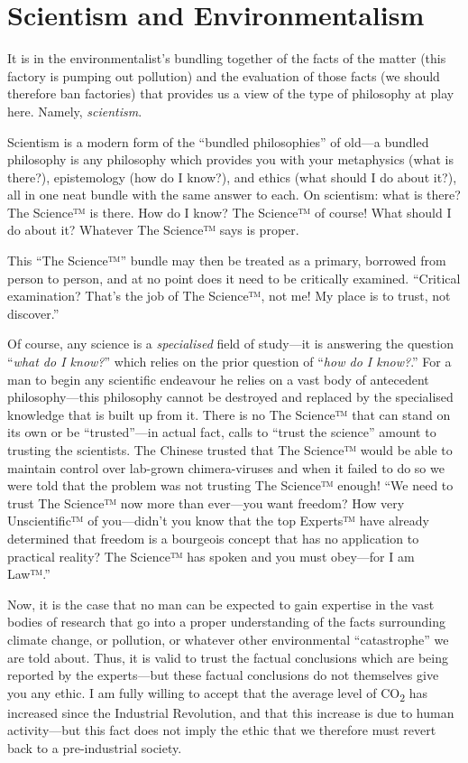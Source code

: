 \documentclass[11pt]{article}
\begin{document}
\section{Scientism and Environmentalism}
\label{sec:org5f4edb6}
It is in the environmentalist's bundling together of the facts of the matter (this factory is pumping out pollution) and the evaluation of those facts (we should therefore ban factories) that provides us a view of the type of philosophy at play here. Namely, \emph{scientism}.

Scientism is a modern form of the ``bundled philosophies'' of old---a bundled philosophy is any philosophy which provides you with your metaphysics (what is there?), epistemology (how do I know?), and ethics (what should I do about it?), all in one neat bundle with the same answer to each. On scientism: what is there? The Science™ is there. How do I know? The Science™ of course! What should I do about it? Whatever The Science™ says is proper.

This ``The Science™'' bundle may then be treated as a primary, borrowed from person to person, and at no point does it need to be critically examined. ``Critical examination? That’s the job of The Science™, not me! My place is to trust, not discover.''

Of course, any science is a \emph{specialised} field of study---it is answering the question ``\emph{what do I know?}'' which relies on the prior question of ``\emph{how do I know?}.'' For a man to begin any scientific endeavour he relies on a vast body of antecedent philosophy---this philosophy cannot be destroyed and replaced by the specialised knowledge that is built up from it. There is no The Science™ that can stand on its own or be ``trusted''---in actual fact, calls to ``trust the science'' amount to trusting the scientists. The Chinese trusted that The Science™ would be able to maintain control over lab-grown chimera-viruses and when it failed to do so we were told that the problem was not trusting The Science™ enough! ``We need to trust The Science™ now more than ever---you want freedom? How very Unscientific™ of you---didn’t you know that the top Experts™ have already determined that freedom is a bourgeois concept that has no application to practical reality? The Science™ has spoken and you must obey---for I am Law™.''

Now, it is the case that no man can be expected to gain expertise in the vast bodies of research that go into a proper understanding of the facts surrounding climate change, or pollution, or whatever other environmental ``catastrophe'' we are told about. Thus, it is valid to trust the factual conclusions which are being reported by the experts---but these factual conclusions do not themselves give you any ethic. I am fully willing to accept that the average level of CO\textsubscript{2} has increased since the Industrial Revolution, and that this increase is due to human activity---but this fact does not imply the ethic that we therefore must revert back to a pre-industrial society.
\end{document}
